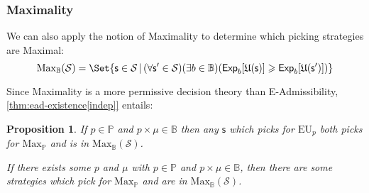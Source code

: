 \documentclass[a4paper]{article}
\newtheorem{proposition}[theorem]{Proposition}
\renewcommand\P{\mathbb{P}} %
\newcommand\Exp{\mathsf{Exp}}
\newcommand\EU{\mathrm{EU}}
\newcommand\EAd{\mathrm{EAd}}
\newcommand\U{\mathfrak{U}} %
\newcommand\Maximality{\mathrm{Max}}
\renewcommand\S{\mathcal{S}}
\newcommand\s{\mathsf{s}}
\newcommand{\IB}{\mathbb{B}}
\newcommand{\IP}{\P}
\renewcommand{\color}[1]{}
\newenvironment{colored}[1]{\leavevmode\color{#1}}{}
\newcommand{\Strategies}{\S}
\newcommand\SetDelimiter[1][]{
	\nonscript\,#1\vert \allowbreak \nonscript\,\mathopen{}}
\providecommand\given{\SetDelimiter}
\renewcommand{\geq}{\geqslant}
\newenvironment{CCM rewritten}
{\begingroup\color{blue}} %
{\endgroup}              %
\begin{document}
	\subsubsection{Maximality}
	We can also apply the notion of Maximality to determine which picking strategies are Maximal: 
	$$\Maximality_\IB(\S)=\Set{\s\in\S\given (\forall \s'\in\S)(\exists b\in\IB)(\Exp_b[\U(\s)]\geq\Exp_b[\U(\s')])}$$
	
Since Maximality is a more permissive decision theory than E-Admissibility, \cref{thm:ead-existence[indep]} entails:


%	

	 \begin{proposition}\label{thm:max-suff}
	If $p\in\IP$ and $p\times\mu\in\IB$ then any $\s$ which picks for $\EU_p$ both picks for $\Maximality_\IP$ and is in $\Maximality_\IB(\S)$. 
	
	If there exists some $p$ and $\mu$ with $p\in\IP$ and $p\times\mu\in\IB$, then there are some strategies which pick for $\Maximality_\IP$ and are in $\Maximality_\IB(\S)$. 
\end{proposition}

\begin{comment}
Since Maximality is a more permissive decision theory than E-Admissibility, \cref{thm:ead-equiv[indep]} entails:



\begin{proposition}\label{thm:max-suff}
	If $\s$ picks for $\EU_p$, for some $p$ in $\IP$ with some $p\times \mu\in \IB$, then $\s$ picks for $\Maximality_\IP$ and $\s$ is in $\Maximality_\IB(\Strategies)$.
%	
\end{proposition}
This is proved in \Cref{sect:maximality-appendix}.
\end{comment}
\end{document}
